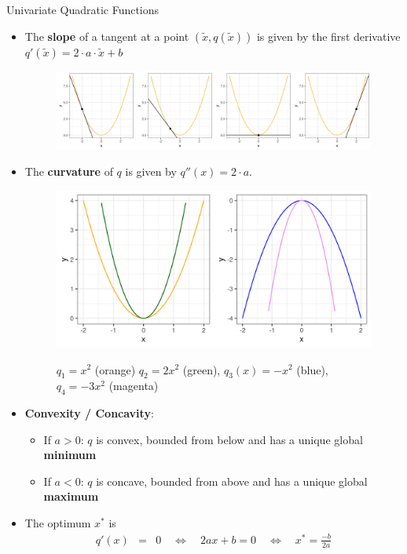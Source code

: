 \begin{vbframe}{Univariate Quadratic Functions}
  \begin{itemize}
    \item The \textbf{slope} of a tangent at a point $(\tilde x, q(\tilde x))$ is given by the first derivative $q'(\tilde x) = 2 \cdot a \cdot \tilde x + b$
    \begin{figure}
    \includegraphics[height=0.2\textwidth, keepaspectratio]{figure_man/quadratic_functions_1D_derivative.png} \\
    \begin{footnotesize} 
    \end{footnotesize}
    \end{figure}
     \item The \textbf{curvature} of $q$ is given by $q''(x) = 2\cdot a$. 
    \begin{figure}
    \includegraphics[height=0.2\textwidth, keepaspectratio]{figure_man/quadratic_functions_1D_curvature.png} \\
    \begin{footnotesize} 
     $q_1 = x^2$ (orange) $q_2 = 2 x^2$ (green), $q_3 (x) = - x^2$ (blue), $q_4 = - 3 x^2$ (magenta)
    \end{footnotesize}
    \end{figure}
  
    \item \textbf{Convexity / Concavity}: 
  
    \begin{itemize}
      \item If $a > 0$: $q$ is convex, bounded from below and has a unique global \textbf{minimum}
      \item If $a < 0$: $q$ is concave, bounded from above and has a unique global \textbf{maximum}
    \end{itemize}
  
    \item The optimum $x^\ast$ is 
    \begin{eqnarray*}
      q'(x) &=& 0 \quad\Leftrightarrow \quad 2ax + b = 0 \quad \Leftrightarrow \quad x^\ast = \frac{-b}{2a}  	
    \end{eqnarray*}
  \end{itemize}
  

\end{vbframe}
